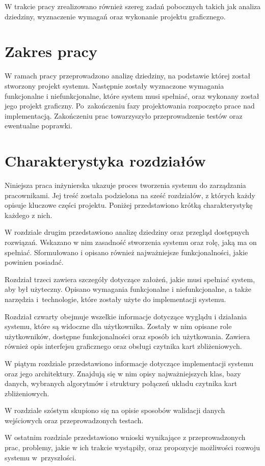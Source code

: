 W trakcie pracy zrealizowano również szereg zadań pobocznych takich jak analiza dziedziny, wyznaczenie wymagań oraz wykonanie projektu graficznego.

\section{Zakres pracy}

W ramach pracy przeprowadzono analizę dziedziny, na podstawie której został stworzony projekt systemu. Następnie zostały wyznaczone wymagania funkcjonalne i niefunkcjonalne, które system musi spełniać, oraz wykonany został jego projekt graficzny. Po~zakończeniu fazy projektowania rozpoczęto prace nad implementacją. Zakończeniu prac towarzyszyło przeprowadzenie testów oraz ewentualne poprawki.

\section{Charakterystyka rozdziałów}


Niniejsza praca inżynierska ukazuje proces tworzenia systemu do zarządzania pracownikami. Jej treść została podzielona na sześć rozdziałów, z których każdy opisuje kluczowe części projektu. Poniżej przedstawiono krótką charakterystykę każdego z nich.

W rozdziale drugim przedstawiono analizę dziedziny oraz przegląd dostępnych rozwiązań. Wskazano w nim zasadność stworzenia systemu oraz rolę, jaką ma on spełniać. Sformułowano i opisano również najważniejsze funkcjonalności, jakie powinien posiadać.

Rozdział trzeci zawiera szczegóły dotyczące założeń, jakie musi spełniać system, aby był użyteczny. Opisano wymagania funkcjonalne i niefunkcjonalne, a także narzędzia i~technologie, które zostały użyte do implementacji systemu.

Rozdział czwarty obejmuje wszelkie informacje dotyczące wyglądu i działania systemu, które są widoczne dla użytkownika. Zostały w nim opisane role użytkowników, dostępne funkcjonalności oraz sposób ich użytkowania. Zawiera również opis interfejsu graficznego oraz obsługi czytnika kart zbliżeniowych.

W piątym rozdziale przedstawiono informacje dotyczące implementacji systemu oraz jego architektury. Znajdują się w nim opisy najważniejszych klas, bazy danych, wybranych algorytmów i struktury połączeń układu czytnika kart zbliżeniowych.

W rozdziale szóstym skupiono się na opisie sposobów walidacji danych wejściowych oraz przeprowadzonych testach.

W ostatnim rozdziale przedstawiono wnioski wynikające z przeprowadzonych prac, problemy, jakie w ich trakcie wystąpiły, oraz propozycje możliwości rozwoju systemu w~przyszłości.


